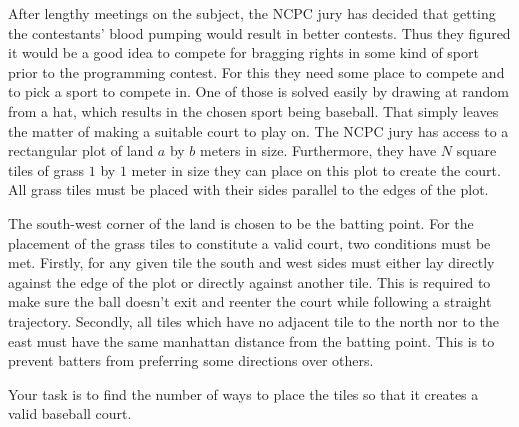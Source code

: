 

After lengthy meetings on the subject, the NCPC jury
has decided that getting the contestants' blood pumping
would result in better contests. Thus they figured it would
be a good idea to compete for bragging rights in some kind of
sport prior to the programming contest. For this they need
some place to compete and to pick a sport to compete in.
One of those is solved easily by drawing at random from a
hat, which results in the chosen sport being baseball.
That simply leaves the matter of making a suitable court
to play on. The NCPC jury has access to a rectangular
plot of land $a$ by $b$ meters in size. Furthermore, they have
$N$ square tiles of grass $1$ by $1$ meter in size 
they can place on this plot to 
create the court. All grass tiles must be placed with their 
sides parallel to the edges of the plot.

The south-west corner of the land is chosen to be the batting point.
For the placement of the grass tiles to constitute a valid
court, two conditions must be met.
Firstly, for any given tile the south and west sides
must either lay directly 
against the edge of the plot or directly against another tile.
This is required to make sure the ball doesn't exit and
reenter the court while following a straight trajectory.
Secondly, all tiles which have no adjacent tile to the
north nor to the east must have the same manhattan 
distance from the batting point.
This is to prevent batters from preferring some directions
over others.

Your task is to find the number of ways to place the tiles so 
that it creates a valid baseball court.

